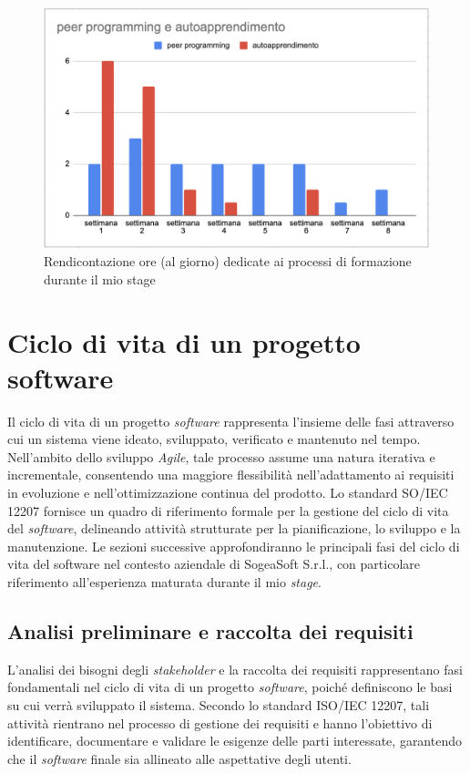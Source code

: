         \begin{figure} [H]
            \centering
            \includegraphics[width=0.8\linewidth]{BCS-Tessi/images/Ore_formazione.png}
            \caption{Rendicontazione ore (al giorno) dedicate ai processi di formazione durante il mio stage}
            \label{fig:Ore-formazione}
        \end{figure}
        

    \section{Ciclo di vita di un progetto software}
    Il ciclo di vita di un progetto \textit{software} rappresenta l’insieme delle fasi attraverso cui un sistema viene ideato, sviluppato, verificato e mantenuto nel tempo. Nell’ambito dello sviluppo \textit{Agile}, tale processo assume una natura iterativa e incrementale, consentendo una maggiore flessibilità nell’adattamento ai requisiti in evoluzione e nell’ottimizzazione continua del prodotto. Lo standard SO/IEC 12207 fornisce un quadro di riferimento formale per la gestione del ciclo di vita del \textit{software}, delineando attività strutturate per la pianificazione, lo sviluppo e la manutenzione. Le sezioni successive approfondiranno le principali fasi del ciclo di vita del software nel contesto aziendale di SogeaSoft S.r.l., con particolare riferimento all’esperienza maturata durante il mio \textit{stage}.
        \subsection{Analisi preliminare e raccolta dei requisiti}
        L’analisi dei bisogni degli \textit{stakeholder} e la raccolta dei requisiti rappresentano fasi fondamentali nel ciclo di vita di un progetto \textit{software}, poiché definiscono le basi su cui verrà sviluppato il sistema. Secondo lo standard ISO/IEC 12207, tali attività rientrano nel processo di gestione dei requisiti e hanno l’obiettivo di identificare, documentare e validare le esigenze delle parti interessate, garantendo che il \textit{software} finale sia allineato alle aspettative degli utenti. 

